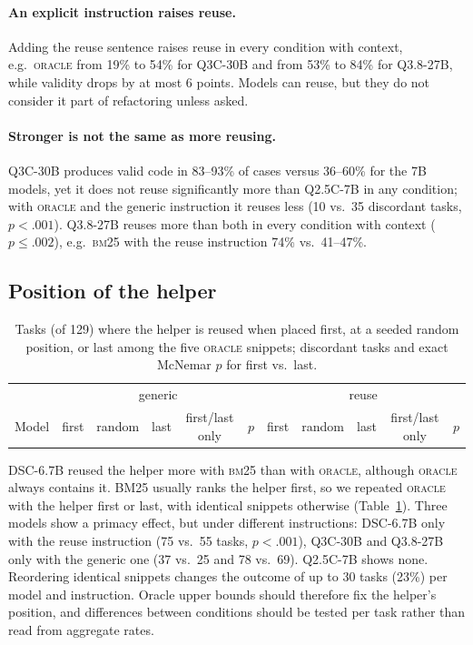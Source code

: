 \documentclass[11pt]{article}
\begin{document}
\paragraph{An explicit instruction raises reuse.}
Adding the reuse sentence raises reuse in every condition with context, e.g.\ \textsc{oracle} from 19\% to 54\%
for Q3C-30B and from 53\% to 84\% for Q3.8-27B, while validity drops by at most 6 points.
Models can reuse, but they do not consider it part of refactoring unless asked.

\paragraph{Stronger is not the same as more reusing.}
Q3C-30B produces valid code in 83--93\% of cases versus 36--60\% for the 7B models, yet it does not
reuse significantly more than Q2.5C-7B in any condition; with \textsc{oracle} and the generic instruction it reuses less
(10 vs.\ 35 discordant tasks, $p<.001$). Q3.8-27B reuses more than both in every condition with context
($p\le.002$), e.g.\ \textsc{bm25} with the reuse instruction 74\% vs.\ 41--47\%.

\subsection{Position of the helper}
\label{sec:position}

\begin{table}[t]
\centering
\small
\begin{tabular}{lccccc|ccccc}
\toprule
& \multicolumn{5}{c|}{generic} & \multicolumn{5}{c}{reuse} \\
Model & first & random & last & first/last only & $p$ & first & random & last & first/last only & $p$ \\
\midrule

\end{tabular}
\caption{Tasks (of 129) where the helper is reused when placed first, at a seeded random position, or last among
the five \textsc{oracle} snippets; discordant tasks and exact McNemar $p$ for first vs.\ last.}
\label{tab:position}
\end{table}

DSC-6.7B reused the helper more with \textsc{bm25} than with \textsc{oracle}, although \textsc{oracle} always
contains it. BM25 usually ranks the helper first, so we repeated \textsc{oracle} with the helper first or last,
with identical snippets otherwise (Table~\ref{tab:position}). Three models show a primacy effect, but under
different instructions: DSC-6.7B only with the reuse instruction (75 vs.\ 55 tasks, $p<.001$), Q3C-30B and
Q3.8-27B only with the generic one (37 vs.\ 25 and 78 vs.\ 69). Q2.5C-7B shows none.
Reordering identical snippets changes the outcome of up to 30 tasks (23\%) per model and instruction. Oracle upper
bounds should therefore fix the helper's position, and differences between conditions should be tested per
task rather than read from aggregate rates.
\end{document}
